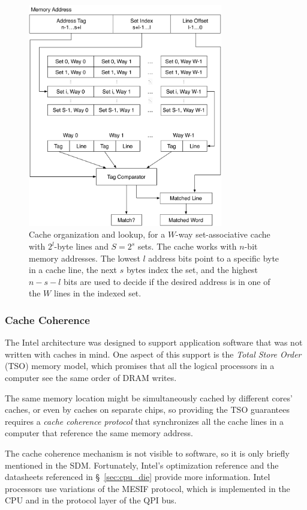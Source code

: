 \begin{figure}[hbt]
  \centering
  \includegraphics[width=85mm]{figures/cpu_cache.pdf}
  \caption{
    Cache organization and lookup, for a $W$-way set-associative cache with
    $2^{l}$-byte lines and $S = 2^{s}$ sets. The cache works with $n$-bit
    memory addresses. The lowest $l$ address bits point to a specific byte in a
    cache line, the next $s$ bytes index the set, and the highest $n - s - l$
    bits are used to decide if the desired address is in one of the $W$ lines
    in the indexed set.
  }
  \label{fig:cpu_cache}
\end{figure}


\subsubsection{Cache Coherence}
\label{sec:cache_coherence}

The Intel architecture was designed to support application software that was
not written with caches in mind. One aspect of this support is the
\textit{Total Store Order} (TSO) \cite{owens2009tso} memory model, which
promises that all the logical processors in a computer see the same order of
DRAM writes.

The same memory location might be simultaneously cached by different cores'
caches, or even by caches on separate chips, so providing the TSO guarantees
requires a \textit{cache coherence protocol} that synchronizes all the cache
lines in a computer that reference the same memory address.

The cache coherence mechanism is not visible to software, so it is only briefly
mentioned in the SDM. Fortunately, Intel's optimization reference
\cite{intel2014optimization} and the datasheets referenced in
\S~\ref{sec:cpu_die} provide more information. Intel processors use variations
of the MESIF \cite{goodman2009mesif} protocol, which is implemented in the CPU
and in the protocol layer of the QPI bus.

